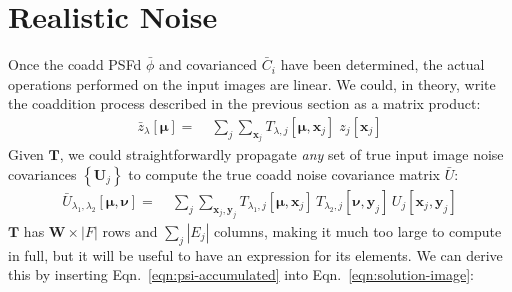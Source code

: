 \documentclass[DM,authoryear,toc]{lsstdoc}
\begin{document}
\section{Realistic Noise}

Once the coadd PSFd $\bar{\phi}$ and covarianced $\bar{C}_i$ have been determined, the actual operations performed on the input images are linear.
We could, in theory, write the coaddition process described in the previous section as a matrix product:
\begin{align}
    \bar{z}_{\lambda}[\bm{\mu}]
    =&\;
    \sum_j \sum_{\bm{x}_j}
    T_{\lambda,j}[\bm{\mu},\bm{x}_j]
    \;
    z_j[\bm{x}_j]
\end{align}
Given $\bm{T}$, we could straightforwardly propagate \emph{any} set of true input image noise covariances $\left\{\bm{U}_j\right\}$ to compute the true coadd noise covariance matrix $\bar{U}$:
\begin{align}
    \bar{U}_{\lambda_1,\lambda_2}[\bm{\mu},\bm{\nu}]
    =&\;
    \sum_j \sum_{\bm{x}_j,\bm{y}_j}
    T_{\lambda_1,j}[\bm{\mu},\bm{x}_j]
    \,
    T_{\lambda_2,j}[\bm{\nu},\bm{y}_j]
    \,
    U_j[\bm{x}_j,\bm{y}_j]
\end{align}
$\bm{T}$ has $\bm{W} \times |F|$ rows and $\sum\limits_j|E_j|$ columns, making it much too large to compute in full, but it will be useful to have an expression for its elements.
We can derive this by inserting Eqn.~\ref{eqn:psi-accumulated} into Eqn.~\ref{eqn:solution-image}:
\end{document}
